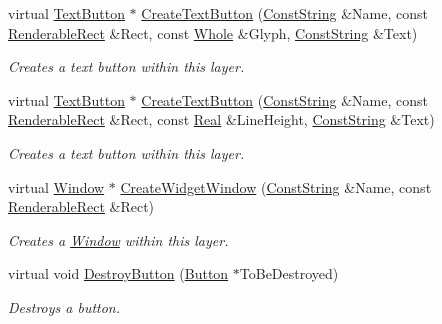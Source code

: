 \begin{DoxyCompactItemize}
virtual \hyperlink{classMezzanine_1_1UI_1_1TextButton}{TextButton} $\ast$ \hyperlink{classMezzanine_1_1UI_1_1Layer_a47b0d4849e7a74c2f886d5618a8216e8}{CreateTextButton} (\hyperlink{namespaceMezzanine_a63cd699ac54b73953f35ec9cfc05e506}{ConstString} \&Name, const \hyperlink{structMezzanine_1_1UI_1_1RenderableRect}{RenderableRect} \&Rect, const \hyperlink{namespaceMezzanine_adcbb6ce6d1eb4379d109e51171e2e493}{Whole} \&Glyph, \hyperlink{namespaceMezzanine_a63cd699ac54b73953f35ec9cfc05e506}{ConstString} \&Text)
\begin{DoxyCompactList}\small\item\em Creates a text button within this layer. \item\end{DoxyCompactList}\item 
virtual \hyperlink{classMezzanine_1_1UI_1_1TextButton}{TextButton} $\ast$ \hyperlink{classMezzanine_1_1UI_1_1Layer_a798fc69951c6d853fbebacd113221ec1}{CreateTextButton} (\hyperlink{namespaceMezzanine_a63cd699ac54b73953f35ec9cfc05e506}{ConstString} \&Name, const \hyperlink{structMezzanine_1_1UI_1_1RenderableRect}{RenderableRect} \&Rect, const \hyperlink{namespaceMezzanine_a726731b1a7df72bf3583e4a97282c6f6}{Real} \&LineHeight, \hyperlink{namespaceMezzanine_a63cd699ac54b73953f35ec9cfc05e506}{ConstString} \&Text)
\begin{DoxyCompactList}\small\item\em Creates a text button within this layer. \item\end{DoxyCompactList}\item 
virtual \hyperlink{classMezzanine_1_1UI_1_1Window}{Window} $\ast$ \hyperlink{classMezzanine_1_1UI_1_1Layer_a6616d0c480ac41748f10f77789eb52ee}{CreateWidgetWindow} (\hyperlink{namespaceMezzanine_a63cd699ac54b73953f35ec9cfc05e506}{ConstString} \&Name, const \hyperlink{structMezzanine_1_1UI_1_1RenderableRect}{RenderableRect} \&Rect)
\begin{DoxyCompactList}\small\item\em Creates a \hyperlink{classMezzanine_1_1UI_1_1Window}{Window} within this layer. \item\end{DoxyCompactList}\item 
virtual void \hyperlink{classMezzanine_1_1UI_1_1Layer_adfc40e5ca5a41cc5ab76303432669e8c}{DestroyButton} (\hyperlink{classMezzanine_1_1UI_1_1Button}{Button} $\ast$ToBeDestroyed)
\begin{DoxyCompactList}\small\item\em Destroys a button. \item\end{DoxyCompactList}\item 

\end{DoxyCompactItemize}
